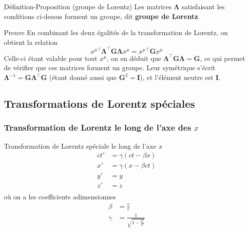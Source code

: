     \begin{omed}{Définition-Proposition (groupe de Lorentz)}
        Les matrices $\symbf{\Lambda}$ satisfaisant les conditions ci-dessus forment un groupe, dit \textbf{groupe de Lorentz}.
    \end{omed}

    \begin{demo}{Preuve}
        En combinant les deux égalités de la transformation de Lorentz, on obtient la relation 
        \[ x^{\mu\top} \symbf{\Lambda}^{\top} \mathbf{G} \symbf{\Lambda} x^{\mu} =  x^{\mu\top} \mathbf{G} x^{\mu} \]
        Celle-ci étant valable pour tout $x^{\mu}$, on en déduit que $ \symbf{\Lambda}^{\top} \mathbf{G}  \symbf{\Lambda} = \mathbf{G}$, ce qui permet de vérifier que ces matrices forment un groupe. Leur symétrique s’écrit $\symbf{\Lambda}^{-1} = \mathbf{G} \symbf{\Lambda}^{\top} \mathbf{G}$ (étant donné aussi que $\mathbf{G}^2 = \mathbf{I}$), et l’élément neutre est $\mathbf{I}$.
    \end{demo}

    \subsection{Transformations de Lorentz spéciales}

        \subsubsection{Transformation de Lorentz le long de l’axe des $x$}

        \begin{omed}{Transformation de Lorentz spéciale le long de l’axe $x$}
            \begin{align*}
                ct' &= \gamma(ct - \beta x) \\
                x' &= \gamma(x - \beta ct) \\
                y' &= y \\
                z' &= z \\
            \end{align*}
            où on a les coefficients adimensionnes
            \begin{align*}
                \beta &= \frac{v}{c} \\
                \gamma &= \frac{1}{\sqrt{1 - \frac{v^2}{c^2}}}
            \end{align*}
        \end{omed}


